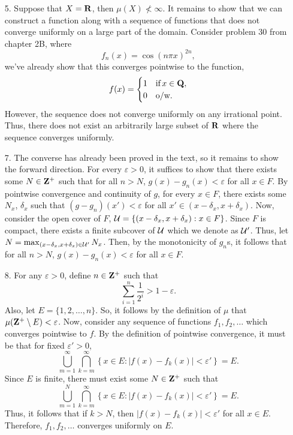 \documentclass{article}
\newcommand{\eps}{\varepsilon}
\theoremstyle{remark}
\begin{document}
\thispagestyle{firstpage}
\begin{enumerate}[leftmargin=*]
    \item[5.] Suppose that $X = \mathbf{R}$, then $\mu(X) \not< \infty$. It remains to
    show that we can construct a function along with a sequence of functions
    that does not converge uniformly on a large part of the domain. Consider
    problem 30 from chapter 2B, where 
    \[
        f_n(x) = \cos(n\pi x)^{2n},    
    \]
    we've already show that this converges pointwise to the function,
    \[
        f(x) = \begin{cases} 1 &\text{if}\, x\in\mathbf{Q}, \\ 0&\text{o/w.}\end{cases}  
    \]
    However, the sequence does not converge uniformly on any irrational point.
    Thus, there does not exist an arbitrarily large subset of $\mathbf{R}$ where the
    sequence converges uniformly. 
    \item[7.] The converse has already been proved in the text, so it remains to
    show the forward direction. For every $\eps > 0$, it suffices to show that
    there exists some $N \in \mathbf{Z}^+$ such that for all $n > N$, $g(x) - g_n(x) <
    \eps$ for all $x \in F$. By pointwise convergence and continuity of $g$, 
    for every $x\in F$, there exists
    some $N_x$, $\delta_x$ such that $(g - g_n)(x') < \eps$ for all $x' \in (x-\delta_x, x+\delta_x)$.
    Now, consider the open cover of $F$, $\mathcal{U} = \{(x-\delta_x, x+\delta_x): x\in F\}$. Since $F$ is 
    compact, there exists a finite subcover of $\mathcal{U}$ which we denote as $\mathcal{U}'$. 
    Thus, let $N = \max_{(x-\delta_x, x+\delta_x) \in \mathcal{U}'} N_x$. Then, by the monotonicity of $g_n$s,
    it follows that for all $n > N$, $g(x) - g_n(x) < \eps$ for all $x \in F$. 
    \item[8.] For any $\eps > 0$, define $n\in\mathbf{Z}^+$ such that 
    \[
        \sum_{i=1}^n \frac{1}{2^i} > 1 - \eps.     
    \]
    Also, let $E = \{1, 2, \ldots, n\}$. So, it follows by the definition of $\mu$ that $\mu(\Z^+\setminus E) < \eps$. 
    Now, consider any sequence of functions $f_1, f_2,\ldots$ which converges pointwise to $f$. By the definition
    of pointwise convergence, it must be that for fixed $\eps' > 0$, 
    \[
        \bigcup_{m=1}^\infty \bigcap_{k=m}^\infty \left\{x\in E: |f(x) - f_k(x)| < \eps'\right\} = E.   
    \]
    Since $E$ is finite, there must exist some $N \in \mathbf{Z}^+$ such that 
    \[
        \bigcup_{m=1}^N \bigcap_{k=m}^\infty \left\{x\in E: |f(x) - f_k(x)| < \eps'\right\} = E.
    \]
    Thus, it follows that if $k > N$, then $|f(x) - f_k(x)| < \eps'$ for all $x\in E$. Therefore, 
    $f_1,f_2,\ldots$ converges uniformly on $E$. 


\end{enumerate}
\end{document}
